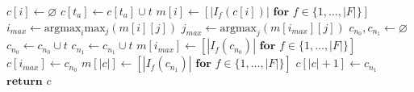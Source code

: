 \documentclass[letterpaper]{article} %
\begin{document}
\begin{algorithm}[t]
\caption{Compute abstract states based on transition samples and learned policy.} \label{alg_makePolicyGraph}
\begin{algorithmic}[1]
      \State $c[i] \leftarrow \varnothing$ 
    \EndFor
     
        \State $c[t_a] \leftarrow c[t_a] \cup t$
      \EndIf
    \EndFor
     
      \State $m[i] \leftarrow [ | I_f(c[i]) | \textbf{ for } f \in \{1, \ldots, |F|\}]$
    \EndFor
      \State $i_{max} \leftarrow \text{argmax}_i \text{max}_j \left( m[i][j] \right)$
      \State $j_{max} \leftarrow \text{argmax}_j \left( m[i_{max}][j] \right)$
      \State $c_{n_0}, c_{n_1} \leftarrow \varnothing$
       
          \State $c_{n_0} \leftarrow c_{n_0} \cup t$
        \Else
          \State $c_{n_1} \leftarrow c_{n_1} \cup t$
        \EndIf
      \EndFor
      \State $m[i_{max}] \leftarrow [|I_f(c_{n_0})| \textbf{ for } f \in \{1, \ldots, |F|\}]$
      \State $c[i_{max}] \leftarrow c_{n_0}$
      \State $m[|c|] \leftarrow [|I_f(c_{n_1})| \textbf{ for } f \in \{1, \ldots, |F|\}]$
      \State $c[|c| + 1] \leftarrow c_{n_1}$
    \EndWhile
    \State $\textbf{return } c$
  \EndProcedure
\end{algorithmic}
\end{algorithm}
\end{document}
